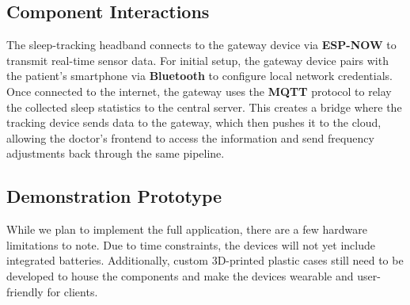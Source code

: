 \subsection{Component Interactions}
The sleep-tracking headband connects to the gateway device via \textbf{ESP-NOW}
to transmit real-time sensor data. For initial setup, the gateway device pairs with the patient's
smartphone via \textbf{Bluetooth} to configure local network credentials. Once connected to the internet,
the gateway uses the \textbf{MQTT} protocol to relay the collected sleep statistics to the central server.
This creates a bridge where the tracking device sends data to the gateway, which then pushes it to
the cloud, allowing the doctor's frontend to access the information and send frequency adjustments
back through the same pipeline.

\subsection{Demonstration Prototype}
While we plan to implement the full application, there are a few hardware limitations to note.
Due to time constraints, the devices will not yet include integrated batteries. Additionally,
custom 3D-printed plastic cases still need to be developed to house the components and make the
devices wearable and user-friendly for clients.
